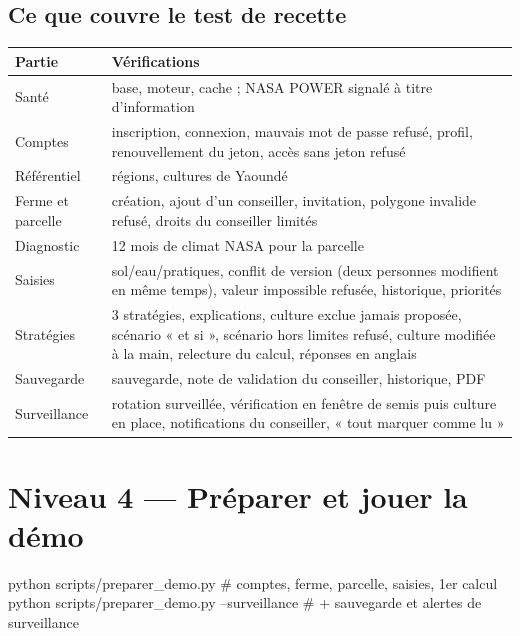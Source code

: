 \documentclass[11pt,a4paper]{article}
\begin{document}
\subsection*{Ce que couvre le test de recette}
\begin{center}
\small
\begin{tabularx}{\textwidth}{L{3.3cm}Y}
\toprule
\textbf{Partie} & \textbf{Vérifications} \\
\midrule
Santé & base, moteur, cache ; NASA POWER signalé à titre d'information \\
Comptes & inscription, connexion, mauvais mot de passe refusé, profil, renouvellement du jeton, accès sans jeton refusé \\
Référentiel & régions, cultures de Yaoundé \\
Ferme et parcelle & création, ajout d'un conseiller, invitation, polygone invalide refusé, droits du conseiller limités \\
Diagnostic & 12 mois de climat NASA pour la parcelle \\
Saisies & sol/eau/pratiques, conflit de version (deux personnes modifient en même temps), valeur impossible refusée, historique, priorités \\
Stratégies & 3 stratégies, explications, culture exclue jamais proposée, scénario « et si », scénario hors limites refusé, culture modifiée à la main, relecture du calcul, réponses en anglais \\
Sauvegarde & sauvegarde, note de validation du conseiller, historique, PDF \\
Surveillance & rotation surveillée, vérification en fenêtre de semis puis culture en place, notifications du conseiller, « tout marquer comme lu » \\
\bottomrule
\end{tabularx}
\end{center}

\section{Niveau 4 — Préparer et jouer la démo}\label{sec:demo}

\begin{code}
python scripts/preparer_demo.py                  # comptes, ferme, parcelle, saisies, 1er calcul
python scripts/preparer_demo.py --surveillance   # + sauvegarde et alertes de surveillance
\end{code}
\end{document}
